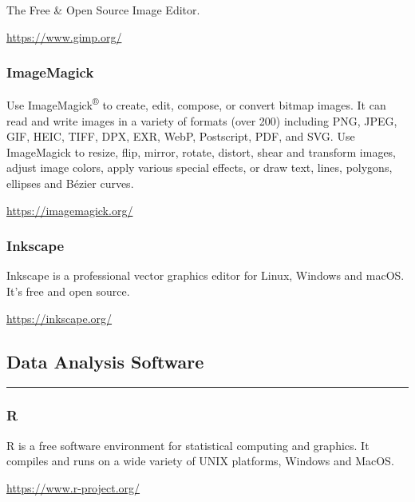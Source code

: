 \documentclass[
]{book}
\theoremstyle{definition}
\theoremstyle{definition}
\theoremstyle{definition}
\theoremstyle{definition}
\theoremstyle{remark}
\begin{document}
The Free \& Open Source Image Editor.

\url{https://www.gimp.org/}

\hypertarget{imagemagick}{%
\subsubsection*{ImageMagick}\label{imagemagick}}

Use ImageMagick\textsuperscript{®} to create, edit, compose, or convert bitmap images. It can read and write images in a variety of formats (over 200) including PNG, JPEG, GIF, HEIC, TIFF, DPX, EXR, WebP, Postscript, PDF, and SVG. Use ImageMagick to resize, flip, mirror, rotate, distort, shear and transform images, adjust image colors, apply various special effects, or draw text, lines, polygons, ellipses and Bézier curves.

\url{https://imagemagick.org/}

\hypertarget{inkscape}{%
\subsubsection*{Inkscape}\label{inkscape}}

Inkscape is a professional vector graphics editor for Linux, Windows and macOS. It's free and open source.

\url{https://inkscape.org/}

\hypertarget{data-analysis-software}{%
\subsection*{Data Analysis Software}\label{data-analysis-software}}

\begin{center}\rule{0.5\linewidth}{0.5pt}\end{center}

\hypertarget{r}{%
\subsubsection*{R}\label{r}}

R is a free software environment for statistical computing and graphics. It compiles and runs on a wide variety of UNIX platforms, Windows and MacOS.

\url{https://www.r-project.org/}
\end{document}

